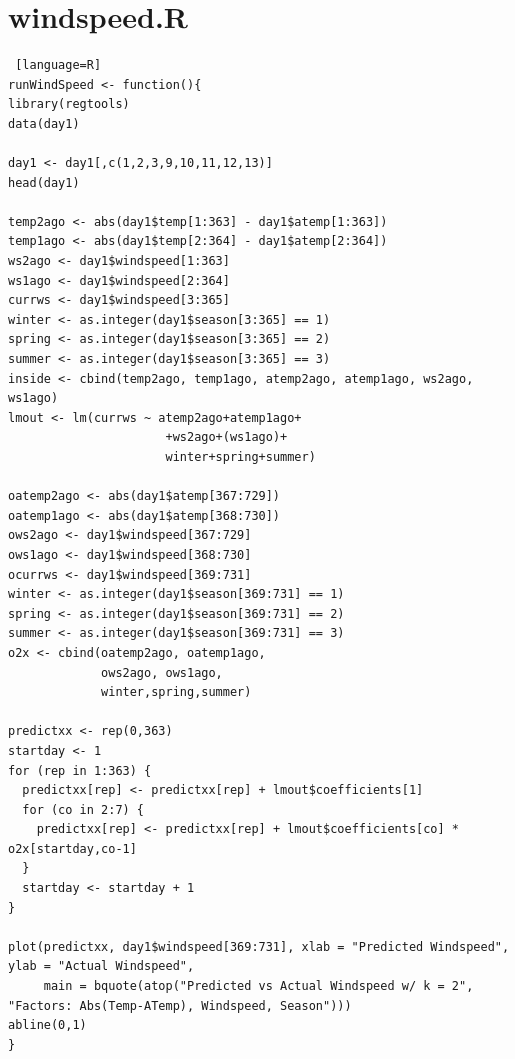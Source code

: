 \documentclass[12pt]{article}
\begin{document}
\section{windspeed.R}
\begin{lstlisting} [language=R]
runWindSpeed <- function(){
library(regtools) 
data(day1)

day1 <- day1[,c(1,2,3,9,10,11,12,13)]
head(day1)

temp2ago <- abs(day1$temp[1:363] - day1$atemp[1:363])
temp1ago <- abs(day1$temp[2:364] - day1$atemp[2:364])
ws2ago <- day1$windspeed[1:363]
ws1ago <- day1$windspeed[2:364]
currws <- day1$windspeed[3:365]
winter <- as.integer(day1$season[3:365] == 1)
spring <- as.integer(day1$season[3:365] == 2)
summer <- as.integer(day1$season[3:365] == 3)
inside <- cbind(temp2ago, temp1ago, atemp2ago, atemp1ago, ws2ago, ws1ago)
lmout <- lm(currws ~ atemp2ago+atemp1ago+
                      +ws2ago+(ws1ago)+
                      winter+spring+summer)

oatemp2ago <- abs(day1$atemp[367:729])
oatemp1ago <- abs(day1$atemp[368:730])
ows2ago <- day1$windspeed[367:729]
ows1ago <- day1$windspeed[368:730]
ocurrws <- day1$windspeed[369:731]
winter <- as.integer(day1$season[369:731] == 1)
spring <- as.integer(day1$season[369:731] == 2)
summer <- as.integer(day1$season[369:731] == 3)
o2x <- cbind(oatemp2ago, oatemp1ago, 
             ows2ago, ows1ago,
             winter,spring,summer)

predictxx <- rep(0,363)
startday <- 1
for (rep in 1:363) {
  predictxx[rep] <- predictxx[rep] + lmout$coefficients[1]
  for (co in 2:7) {
    predictxx[rep] <- predictxx[rep] + lmout$coefficients[co] * o2x[startday,co-1]
  }
  startday <- startday + 1
}

plot(predictxx, day1$windspeed[369:731], xlab = "Predicted Windspeed", ylab = "Actual Windspeed", 
     main = bquote(atop("Predicted vs Actual Windspeed w/ k = 2", "Factors: Abs(Temp-ATemp), Windspeed, Season")))
abline(0,1)
}


\end{lstlisting}
\end{document}
